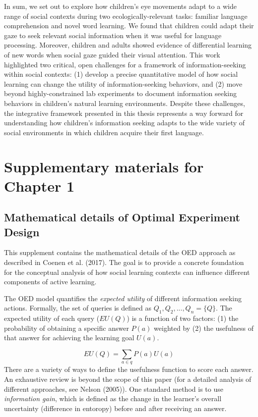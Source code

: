 \documentclass[oneside]{report}
\begin{document}
In sum, we set out to explore how children's eye movements adapt to a
wide range of social contexts during two ecologically-relevant tasks:
familiar language comprehension and novel word learning. We found that
children could adapt their gaze to seek relevant social information when
it was useful for language processing. Moreover, children and adults
showed evidence of differential learning of new words when social gaze
guided their visual attention. This work highlighted two critical, open
challenges for a framework of information-seeking within social
contexts: (1) develop a precise quantitative model of how social
learning can change the utility of information-seeking behaviors, and
(2) move beyond highly-constrained lab experiments to document
information seeking behaviors in children's natural learning
environments. Despite these challenges, the integrative framework
presented in this thesis represents a way forward for understanding how
children's information seeking adapts to the wide variety of social
environments in which children acquire their first language.

\appendix

\chapter{Supplementary materials for Chapter
1}\label{supplementary-materials-for-chapter-1}

\section{Mathematical details of Optimal Experiment
Design}\label{mathematical-details-of-optimal-experiment-design}

This supplement contains the mathematical details of the OED approach as
described in Coenen et al. (2017). The goal is to provide a concrete
foundation for the conceptual analysis of how social learning contexts
can influence different components of active learning.

The OED model quantifies the \emph{expected utility} of different
information seeking actions. Formally, the set of queries is defined as
\(Q_1, Q_2,..., Q_n = \{Q\}\). The expected utility of each query
(\(EU(Q)\)) is a function of two factors: (1) the probability of
obtaining a specific answer \(P(a)\) weighted by (2) the usefulness of
that answer for achieving the learning goal \(U(a)\).

\[EU(Q) = \sum_{a\in q}{P(a)U(a)}\] \noindent
There are a variety of ways to define the usefulness function to score
each answer. An exhaustive review is beyond the scope of this paper (for
a detailed analysis of different approaches, see Nelson (2005)). One
standard method is to use \emph{information gain}, which is defined as
the change in the learner's overall uncertainty (difference in entoropy)
before and after receiving an answer.
\end{document}
